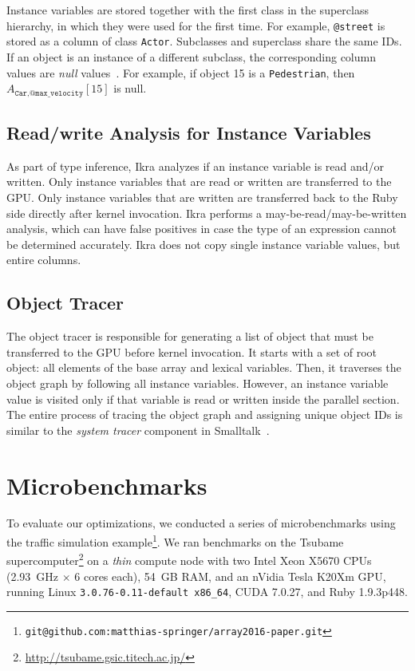 \documentclass[preprint]{sigplanconf}
\begin{document}
Instance variables are stored together with the first class in the superclass hierarchy, in which they were used for the first time. For example, \texttt{@street} is stored as a column of class \texttt{Actor}. Subclasses and superclass share the same IDs. If an object is an instance of a different subclass, the corresponding column values are \emph{null} values~\cite{Mattis:2015:COI:2814228.2814230}. For example, if object 15 is a \texttt{Pedestrian}, then $A_{\texttt{Car}, \texttt{@max\_velocity}}[15]$ is null.

\subsection{Read/write Analysis for Instance Variables}
\label{sec:impl_copyback}
As part of type inference, Ikra analyzes if an instance variable is read and/or written. Only instance variables that are read or written are transferred to the GPU. Only instance variables that are written are transferred back to the Ruby side directly after kernel invocation. Ikra performs a may-be-read/may-be-written analysis, which can have false positives in case the type of an expression cannot be determined accurately. Ikra does not copy single instance variable values, but entire columns.

\subsection{Object Tracer}
\label{sec:impl_tracer}
The object tracer is responsible for generating a list of object that must be transferred to the GPU before kernel invocation. It starts with a set of root object: all elements of the base array and lexical variables. Then, it traverses the object graph by following all instance variables. However, an instance variable value is visited only if that variable is read or written inside the parallel section. The entire process of tracing the object graph and assigning unique object IDs is similar to the \emph{system tracer} component in Smalltalk~\cite{Krasner:1983:SBH:226}.

\section{Microbenchmarks}
To evaluate our optimizations, we conducted a series of microbenchmarks using the traffic simulation example\footnote{\texttt{git@github.com:matthias-springer/array2016-paper.git}}. We ran benchmarks on the Tsubame supercomputer\footnote{\url{http://tsubame.gsic.titech.ac.jp/}} on a \emph{thin} compute node with two Intel Xeon X5670 CPUs (2.93~GHz $\times$ 6 cores each), 54~GB RAM, and an nVidia Tesla K20Xm GPU, running Linux \texttt{3.0.76-0.11-default x86\_64}, CUDA 7.0.27, and Ruby 1.9.3p448.
\end{document}
